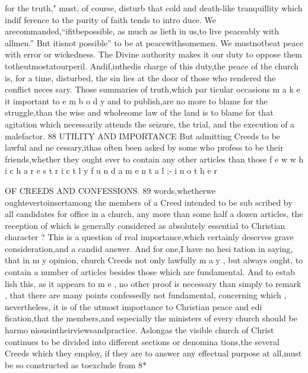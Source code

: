 \documentclass[
]{book}
\begin{document}
for the truth," must, of course, disturb that cold and death-like tranquillity which indif
ference to the purity of faith tends to intro
duce. We arecommanded,``ifitbepossible,
as much as lieth in us,to live peaceably with
allmen.'' But itisnot possible'' to be at peacewithsomemen. We mustnotbeat
peace with error or wickedness. The Divine authority makes it our duty to oppose them
totheutmostatourperil. Andif,inthedis charge of this duty,the peace of the church is, for a time, disturbed, the sin lies at the door of those who rendered the conflict neces sary. Those summaries of truth,which par ticular occasions m a k e it important to e m b o d y and to publish,are no more to blame for the struggle,than the wise and wholesome law of
the land is to blame for that agitation which
necessarily attends the seizure, the trial, and the execution of a malefactor.
88 UTILITY AND IMPORTANCE
But admitting Creeds to be lawful and ne cessary,ithas often been asked by some who profess to be their friends,whether they ought ever to contain any other articles than those f e w w h i c h a r e s t r i c t l y f u n d a m e n t a l ;- i n o t h e r

OF CREEDS AND CONFESSIONS. 89
words,whetherwe oughtevertoinsertamong the members of a Creed intended to be sub
scribed by all candidates for office in a church, any more than some half a dozen articles, the reception of which is generally considered as absolutely essential to Christian character ?
This is a question of real importance,which
certainly deserves grave consideration,and a candid answer. And for one,I have no hesi
tation in saying, that in m y opinion, church Creeds not only lawfully m a y , but always ought, to contain a number of articles besides those which are fundamental. And to estab
lish this, as it appears to m e , no other proof is necessary than simply to remark , that there
are many points confessedly not fundamental,
concerning which , nevertheless, it is of the
utmost importance to Christian peace and edi
fication,that the members,and especially the ministers of every church should be harmo
niousintheirviewsandpractice. Aslongas the visible church of Christ continues to be
divided into different sections or denomina
tions,the several Creeds which they employ, if they are to answer any effectual purpose at all,must be so constructed as toexclude from
8*
\end{document}
